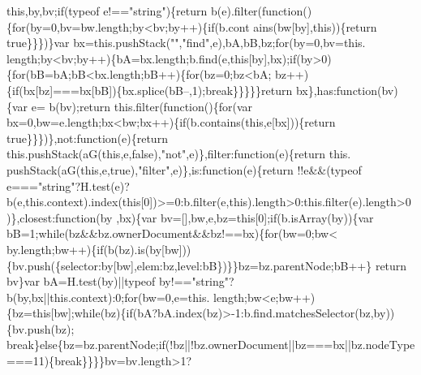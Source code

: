 \begin{DoxyCode}
{      this},by,bv;\textcolor{keywordflow}{if}(typeof e!==\textcolor{stringliteral}{"string"})\{\textcolor{keywordflow}{return} b(e).filter(\textcolor{keyword}{function}()\{\textcolor{keywordflow}{for}(by=0,bv=bw.length;by<bv;by++)\{if(b.cont
      ains(bw[by],this))\{return true\}\}\})\}var bx=this.pushStack(\textcolor{stringliteral}{""},\textcolor{stringliteral}{"find"},e),bA,bB,bz;\textcolor{keywordflow}{for}(by=0,bv=this.
      length;by<bv;by++)\{bA=bx.length;b.find(e,\textcolor{keyword}{this}[by],bx);\textcolor{keywordflow}{if}(by>0)\{\textcolor{keywordflow}{for}(bB=bA;bB<bx.length;bB++)\{\textcolor{keywordflow}{for}(bz=0;bz<bA;
      bz++)\{\textcolor{keywordflow}{if}(bx[bz]===bx[bB])\{bx.splice(bB--,1);\textcolor{keywordflow}{break}\}\}\}\}\}\textcolor{keywordflow}{return} bx\},has:\textcolor{keyword}{function}(bv)\{var e=
      b(bv);\textcolor{keywordflow}{return} this.filter(\textcolor{keyword}{function}()\{\textcolor{keywordflow}{for}(var bx=0,bw=e.length;bx<bw;bx++)\{if(b.contains(this,e[bx]))\{return 
      true\}\}\})\},not:\textcolor{keyword}{function}(e)\{\textcolor{keywordflow}{return} this.pushStack(aG(\textcolor{keyword}{this},e,\textcolor{keyword}{false}),\textcolor{stringliteral}{"not"},e)\},filter:\textcolor{keyword}{function}(e)\{\textcolor{keywordflow}{return} this.
      pushStack(aG(\textcolor{keyword}{this},e,\textcolor{keyword}{true}),\textcolor{stringliteral}{"filter"},e)\},is:\textcolor{keyword}{function}(e)\{\textcolor{keywordflow}{return} !!e&&(typeof e===\textcolor{stringliteral}{"string"}?H.test(e)?
      b(e,this.context).index(\textcolor{keyword}{this}[0])>=0:b.filter(e,\textcolor{keyword}{this}).length>0:this.filter(e).length>0)\},closest:\textcolor{keyword}{function}(by
      ,bx)\{var bv=[],bw,e,bz=\textcolor{keyword}{this}[0];\textcolor{keywordflow}{if}(b.isArray(by))\{var bB=1;\textcolor{keywordflow}{while}(bz&&bz.ownerDocument&&bz!==bx)\{\textcolor{keywordflow}{for}(bw=0;bw<
      by.length;bw++)\{\textcolor{keywordflow}{if}(b(bz).is(by[bw]))\{bv.push(\{selector:by[bw],elem:bz,level:bB\})\}\}bz=bz.parentNode;bB++\}\textcolor{keywordflow}{
      return} bv\}var bA=H.test(by)||typeof by!==\textcolor{stringliteral}{"string"}?b(by,bx||this.context):0;\textcolor{keywordflow}{for}(bw=0,e=this.
      length;bw<e;bw++)\{bz=\textcolor{keyword}{this}[bw];\textcolor{keywordflow}{while}(bz)\{\textcolor{keywordflow}{if}(bA?bA.index(bz)>-1:b.find.matchesSelector(bz,by))\{bv.push(bz);\textcolor{keywordflow}{
      break}\}\textcolor{keywordflow}{else}\{bz=bz.parentNode;\textcolor{keywordflow}{if}(!bz||!bz.ownerDocument||bz===bx||bz.nodeType===11)\{\textcolor{keywordflow}{break}\}\}\}\}bv=bv.length>1?

\end{DoxyCode}
